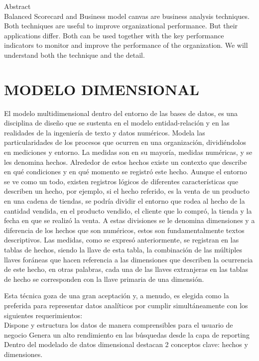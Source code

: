 


 Abstract\\
Balanced Scorecard and Business model canvas are business analysis techniques. Both techniques are useful to improve organizational performance. But their applications differ. Both can be used together with the key performance indicators to monitor and improve the performance of the organization. We will understand both the technique and the detail.
\newpage

\section{MODELO DIMENSIONAL}
El modelo multidimensional dentro del entorno de las bases de datos, es una disciplina de diseño que se sustenta en el modelo entidad-relación y en las realidades de la ingeniería de texto y datos numéricos. 
Modela las particularidades de los procesos que  ocurren en una organización, dividiéndolos en mediciones y entorno. La medidas son en su mayoría, medidas numéricas, y se les denomina hechos. Alrededor de estos hechos existe un contexto que describe en qué condiciones y en qué momento se registró este hecho. Aunque el entorno se ve como un todo, existen registros lógicos de diferentes características que describen un hecho, por ejemplo, si el hecho referido, es la venta de un producto en una cadena de tiendas, se podría dividir el entorno que rodea al hecho de la cantidad vendida, en el producto vendido, el cliente que lo compró, la tienda y la fecha en que se realizó la venta. A estas divisiones se le denomina dimensiones y a diferencia de los hechos que son numéricos, estos son fundamentalmente textos descriptivos.
Las medidas, como se  expresó anteriormente, se registran en las tablas de hechos, siendo la llave de esta tabla, la combinación de las múltiples llaves foráneas que hacen referencia   a las
dimensiones que describen la ocurrencia de este hecho, en otras palabras, cada una de las llaves extranjeras en las tablas de hecho se corresponden con la llave primaria de una dimensión.

Esta técnica goza de una gran aceptación y, a menudo, es elegida como la preferida para representar datos analíticos por cumplir simultáneamente con los siguientes requerimientos:\\
Dispone y estructura los datos de manera comprensibles para el usuario de negocio
Genera un alto rendimiento en las búsquedas desde la capa de reporting
Dentro del modelado de datos dimensional destacan 2 conceptos clave: hechos y dimensiones.


